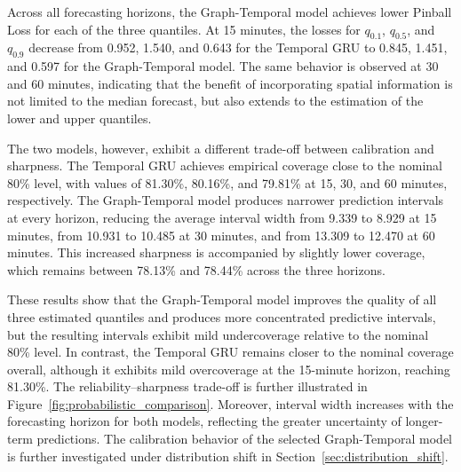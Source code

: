 Across all forecasting horizons, the Graph-Temporal model achieves lower
Pinball Loss for each of the three quantiles. At 15 minutes, the losses for
$q_{0.1}$, $q_{0.5}$, and $q_{0.9}$ decrease from 0.952, 1.540, and 0.643
for the Temporal GRU to 0.845, 1.451, and 0.597 for the Graph-Temporal
model. The same behavior is observed at 30 and 60 minutes, indicating that
the benefit of incorporating spatial information is not limited to the
median forecast, but also extends to the estimation of the lower and upper
quantiles.

The two models, however, exhibit a different trade-off between calibration
and sharpness. The Temporal GRU achieves empirical coverage close to the
nominal 80\% level, with values of 81.30\%, 80.16\%, and 79.81\% at 15,
30, and 60 minutes, respectively. The Graph-Temporal model produces narrower
prediction intervals at every horizon, reducing the average interval width
from 9.339 to 8.929 at 15 minutes, from 10.931 to 10.485 at 30 minutes, and
from 13.309 to 12.470 at 60 minutes. This increased sharpness is accompanied
by slightly lower coverage, which remains between 78.13\% and 78.44\% across
the three horizons.

These results show that the Graph-Temporal model improves the quality of all
three estimated quantiles and produces more concentrated predictive
intervals, but the resulting intervals exhibit mild undercoverage relative
to the nominal 80\% level. In contrast, the Temporal GRU remains closer to
the nominal coverage overall, although it exhibits mild overcoverage at the
15-minute horizon, reaching 81.30\%.
The reliability--sharpness trade-off is further illustrated in
Figure~\ref{fig:probabilistic_comparison}.
Moreover, interval width increases with the
forecasting horizon for both models, reflecting the greater uncertainty of
longer-term predictions. The calibration behavior of the selected
Graph-Temporal model is further investigated under distribution shift in
Section~\ref{sec:distribution_shift}.

